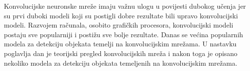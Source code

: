 Konvolucijske neuronske mreže imaju važnu ulogu u povijesti dubokog učenja jer su prvi duboki modeli koji su postigli dobre rezultate bili upravo konvolucijski modeli. Razvojem računala, osobito grafičkih procesora, konvolucijski modeli postaju sve popularniji i postižu sve bolje rezultate. Danas se većina popularnih modela za detekciju objekata temelji na konvolucijskim mrežama. U nastavku poglavlja dan je teorijski pregled konvolucijskih mreža i nakon toga je opisano nekoliko modela za detekciju objekata temeljenih na konvolucijskim mrežama.